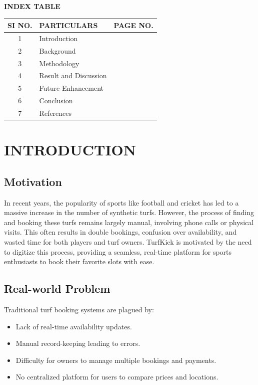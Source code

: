 \documentclass[12pt]{report}
\begin{document}
\newpage
\tableofcontents

\newpage
\begin{center}
    {\huge \textbf{INDEX TABLE} \par}
\end{center}
\vspace{1cm}
\begin{longtable}{|c|l|c|}
\hline
\textbf{SI NO.} & \textbf{PARTICULARS} & \textbf{PAGE NO.} \\
\hline
1 & Introduction & \pageref{chap:intro} \\
\hline
2 & Background & \pageref{chap:background} \\
\hline
3 & Methodology & \pageref{chap:method} \\
\hline
4 & Result and Discussion & \pageref{chap:result} \\
\hline
5 & Future Enhancement & \pageref{chap:future} \\
\hline
6 & Conclusion & \pageref{chap:conclusion} \\
\hline
7 & References & \pageref{chap:ref} \\
\hline
\end{longtable}


\chapter{INTRODUCTION}
\label{chap:intro}

\section{Motivation}
In recent years, the popularity of sports like football and cricket has led to a massive increase in the number of synthetic turfs. However, the process of finding and booking these turfs remains largely manual, involving phone calls or physical visits. This often results in double bookings, confusion over availability, and wasted time for both players and turf owners. TurfKick is motivated by the need to digitize this process, providing a seamless, real-time platform for sports enthusiasts to book their favorite slots with ease.

\section{Real-world Problem}
Traditional turf booking systems are plagued by:
\begin{itemize}
    \item Lack of real-time availability updates.
    \item Manual record-keeping leading to errors.
    \item Difficulty for owners to manage multiple bookings and payments.
    \item No centralized platform for users to compare prices and locations.
\end{itemize}
\end{document}
